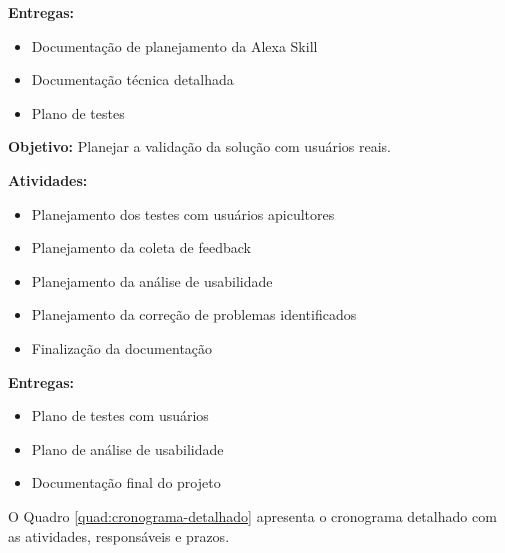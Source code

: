 \textbf{Entregas:}
\begin{itemize}
    \item Documentação de planejamento da Alexa Skill
    \item Documentação técnica detalhada
    \item Plano de testes
\end{itemize}


\textbf{Objetivo:} Planejar a validação da solução com usuários reais.

\textbf{Atividades:}
\begin{itemize}
    \item Planejamento dos testes com usuários apicultores
    \item Planejamento da coleta de feedback
    \item Planejamento da análise de usabilidade
    \item Planejamento da correção de problemas identificados
    \item Finalização da documentação
\end{itemize}

\textbf{Entregas:}
\begin{itemize}
    \item Plano de testes com usuários
    \item Plano de análise de usabilidade
    \item Documentação final do projeto
\end{itemize}

\label{sec:cronograma-detalhado}

O Quadro \ref{quad:cronograma-detalhado} apresenta o cronograma detalhado com as atividades, responsáveis e prazos.

